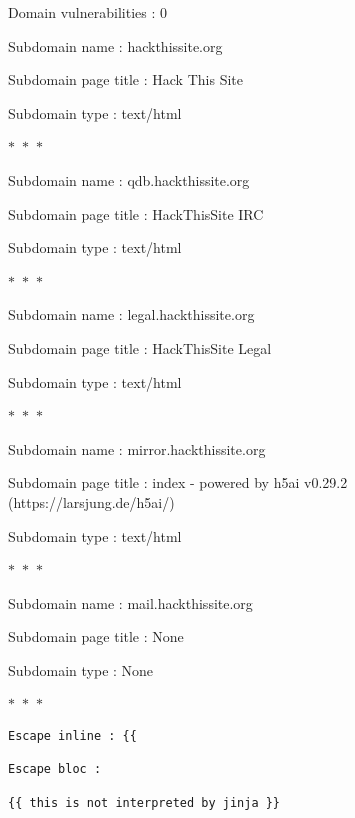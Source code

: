 \documentclass[a4paper,11pt]{book}
\begin{document}
\begin{itemize}
    Domain vulnerabilities : 0
    


        Subdomain name : hackthissite.org

        Subdomain page title : Hack This Site

        Subdomain type : text/html

        \begin{center}
            $\ast$~$\ast$~$\ast$
        \end{center}

        Subdomain name : qdb.hackthissite.org

        Subdomain page title : HackThisSite IRC

        Subdomain type : text/html

        \begin{center}
            $\ast$~$\ast$~$\ast$
        \end{center}

        Subdomain name : legal.hackthissite.org

        Subdomain page title : HackThisSite Legal

        Subdomain type : text/html

        \begin{center}
            $\ast$~$\ast$~$\ast$
        \end{center}

        Subdomain name : mirror.hackthissite.org

        Subdomain page title : index - powered by h5ai v0.29.2 (https://larsjung.de/h5ai/)

        Subdomain type : text/html

        \begin{center}
            $\ast$~$\ast$~$\ast$
        \end{center}

        Subdomain name : mail.hackthissite.org

        Subdomain page title : None

        Subdomain type : None

        \begin{center}
            $\ast$~$\ast$~$\ast$
        \end{center}

    


\end{itemize}


\begin{verbatim} 
Escape inline : {{

Escape bloc : 
 
{{ this is not interpreted by jinja }}

\end{verbatim}
\end{document}
